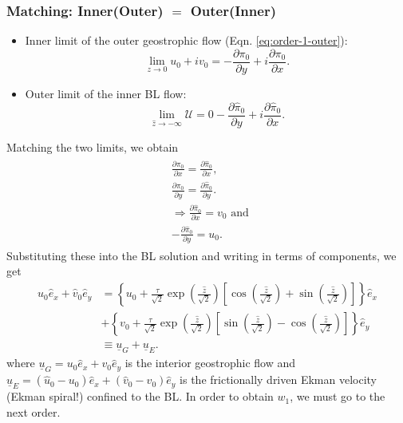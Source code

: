 \documentclass{article}
\newcommand{\pd}[2]{\frac{\partial{#1}}{\partial{#2}}}
\begin{document}
\subsubsection{Matching: Inner(Outer) $=$ Outer(Inner)}
\begin{itemize}
 \item Inner limit of the outer geostrophic flow (Eqn. \ref{eq:order-1-outer}):
 \begin{equation}
  \lim_{z \rightarrow 0} u_{0} + i v_{0} = - \pd{\pi_{0}}{y} + i \pd{\pi_{0}}{x}.
 \end{equation}
 \item Outer limit of the inner BL flow:
 \begin{equation}
  \lim_{\hat{z} \rightarrow -\infty} \mathcal{U} = 0 - \pd{\hat{\pi}_{0}}{y} + i \pd{\hat{\pi}_{0}}{x}.
 \end{equation}
\end{itemize}
%
Matching the two limits, we obtain
\begin{align}
 \begin{split}
   & \pd{\pi_{0}}{x} = \pd{\hat{\pi}_{0}}{x},\\
   & \pd{\pi_{0}}{y} = \pd{\hat{\pi}_{0}}{y}. \\
   & \Rightarrow \boxed{\pd{\hat{\pi}_{0}}{x} = v_{0} }\textrm{ and }\\
   & \boxed{ -\pd{\hat{\pi}_{0}}{y} = u_{0}}.   
 \end{split}
\end{align}
%
Substituting these into the BL solution and writing in terms of components, we get
%
\begin{align}\label{eq:bl-full-soln-order-1}
 \hat{u}_{0} \hat{e}_{x} + \hat{v}_{0} \hat{e}_{y} &= \left\{ u_{0} + \frac{\tau}{\sqrt{2}} \exp{\left(\frac{\hat{z}}{\sqrt{2}}\right)} \left[\cos{\left(\frac{\hat{z}}{\sqrt{2}} \right)} + \sin{\left(\frac{\hat{z}}{\sqrt{2}} \right)} \right] \right\}\hat{e}_{x} \\
 &+ \left\{ v_{0} + \frac{\tau}{\sqrt{2}} \exp{\left(\frac{\hat{z}}{\sqrt{2}}\right)} \left[\sin{\left(\frac{\hat{z}}{\sqrt{2}} \right)} - \cos{\left(\frac{\hat{z}}{\sqrt{2}} \right)} \right] \right\}\hat{e}_{y}\\
 &\equiv \underline{u}_{G} + \underline{u}_{E}.
\end{align}
%
where $\underline{u}_{G} = u_{0}\hat{e}_{x} + v_{0}\hat{e}_{y}$ is the interior geostrophic flow and  $\underline{u}_{E} = (\hat{u}_{0}-u_{0})\hat{e}_{x} + (\hat{v}_{0} - v_{0})\hat{e}_{y}$ is the frictionally driven Ekman velocity (Ekman spiral!) confined to the BL. In order to obtain $w_{1}$, we must go to the next order.
\end{document}
